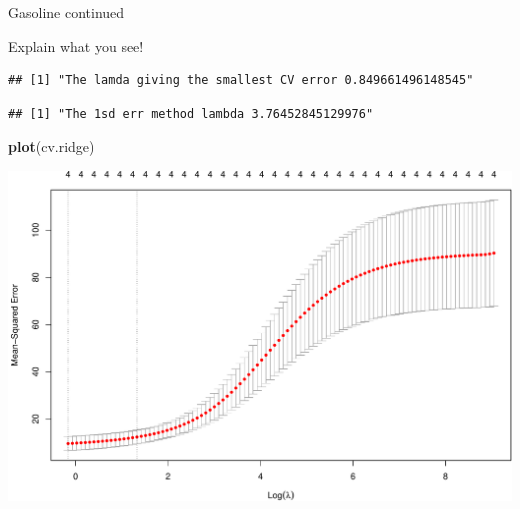 \documentclass[
  ignorenonframetext,
]{beamer}
\newenvironment{Shaded}{\begin{snugshade}}{\end{snugshade}}
\newcommand{\DataTypeTok}[1]{\textcolor[rgb]{0.13,0.29,0.53}{#1}}
\newcommand{\DecValTok}[1]{\textcolor[rgb]{0.00,0.00,0.81}{#1}}
\newcommand{\FloatTok}[1]{\textcolor[rgb]{0.00,0.00,0.81}{#1}}
\newcommand{\KeywordTok}[1]{\textcolor[rgb]{0.13,0.29,0.53}{\textbf{#1}}}
\newcommand{\NormalTok}[1]{#1}
\newcommand{\OperatorTok}[1]{\textcolor[rgb]{0.81,0.36,0.00}{\textbf{#1}}}
\newcommand{\StringTok}[1]{\textcolor[rgb]{0.31,0.60,0.02}{#1}}
\begin{document}
\begin{frame}[fragile]

\begin{block}{Gasoline continued}

Explain what you see!

\begin{Shaded}
\end{Shaded}

\begin{verbatim}
## [1] "The lamda giving the smallest CV error 0.849661496148545"
\end{verbatim}

\begin{Shaded}
\end{Shaded}

\begin{verbatim}
## [1] "The 1sd err method lambda 3.76452845129976"
\end{verbatim}

\begin{Shaded}
\begin{Highlighting}[]
\KeywordTok{plot}\NormalTok{(cv.ridge)}
\end{Highlighting}
\end{Shaded}

\includegraphics{L2_files/figure-beamer/unnamed-chunk-10-1.pdf}


\end{block}
\end{frame}
\end{document}
